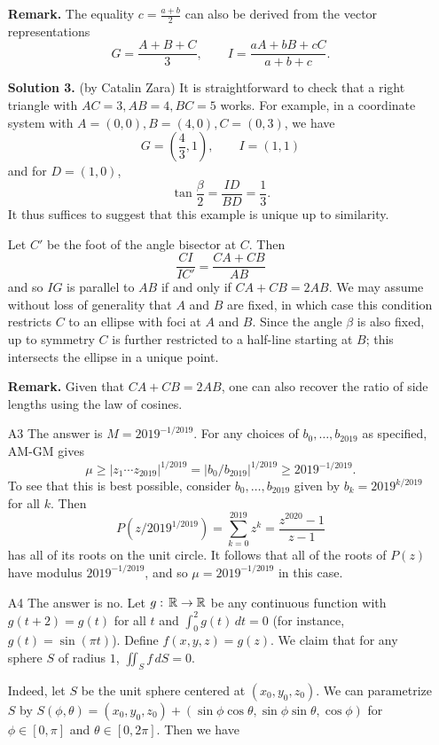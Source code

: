 \documentclass[amssymb,twocolumn,pra,10pt,aps]{revtex4-1}
\begin{document}
\begin{itemize}
\noindent
\textbf{Remark.}
The equality $c = \frac{a+b}{2}$ can also be derived from the vector representations
\[
G = \frac{A+B+C}{3}, \qquad I = \frac{aA+bB+cC}{a+b+c}.
\]


\noindent
\textbf{Solution 3.}
(by Catalin Zara)
It is straightforward to check that a right triangle with $AC = 3, AB = 4, BC = 5$ works. For example,
in a coordinate system with $A = (0,0), B = (4,0), C = (0,3)$, we have
\[
G = \left(\frac{4}{3}, 1 \right), \qquad 
I = (1, 1)
\]
and for $D = (1,0)$, 
\[
\tan \frac{\beta}{2} = \frac{ID}{BD} = \frac{1}{3}.
\]
It thus suffices to suggest that this example is unique up to similarity.

Let $C'$ be the foot of the angle bisector at $C$. Then 
\[
\frac{CI}{IC'} = \frac{CA + CB}{AB}
\] 
and so $IG$ is parallel to $AB$ if and only if $CA + CB = 2AB$. We may assume without loss of generality that $A$ and $B$ are fixed, in which case this condition restricts $C$ to an ellipse with foci at $A$ and $B$.
Since the angle $\beta$ is also fixed, up to symmetry 
$C$ is further restricted to a half-line starting at $B$; this intersects the ellipse in a unique point.

\noindent 
\textbf{Remark.}
Given that $CA + CB = 2AB$, one can also recover the ratio of side lengths using the law of cosines.

\item[A3]
The answer is $M = 2019^{-1/2019}$. For any choices of $b_0,\ldots,b_{2019}$ as specified, AM-GM gives
\[
\mu \geq |z_1\cdots z_{2019}|^{1/2019} = |b_0/b_{2019}|^{1/2019} \geq 2019^{-1/2019}.
\]
To see that this is best possible, consider $b_0,\ldots,b_{2019}$ given by $b_k = 2019^{k/2019}$ for all $k$. Then 
\[
P(z/2019^{1/2019}) = \sum_{k=0}^{2019} z^k = \frac{z^{2020}-1}{z-1}
\]
has all of its roots on the unit circle. It follows that all of the roots of $P(z)$ have modulus $2019^{-1/2019}$, and so $\mu = 2019^{-1/2019}$ in this case.


\item[A4]
The answer is no. Let $g :\thinspace \mathbb{R} \to \mathbb{R}$ be any continuous function with $g(t+2) = g(t)$ for all $t$ and $\int_0^2 g(t)\,dt = 0$ (for instance, $g(t) = \sin(\pi t)$). Define $f(x,y,z) = g(z)$. We claim that for any sphere $S$ of radius $1$, $\iint_S f\,dS = 0$.


Indeed, let $S$ be the unit sphere centered at $(x_0,y_0,z_0)$. We can parametrize $S$ by $S(\phi,\theta) = (x_0,y_0,z_0)+(\sin\phi\cos\theta,
\sin\phi\sin\theta,\cos\phi)$ for $\phi \in [0,\pi]$ and $\theta \in [0,2\pi]$. Then we have


\end{itemize}
\end{document}
